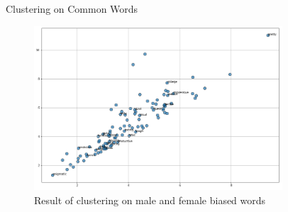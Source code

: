 \documentclass{beamer}
\begin{document}
	\begin{frame}{Clustering on Common Words}
		\vspace{3mm}
		\begin{figure}[H]
			\centerline{\includegraphics[width=25em]{biased_misc.png}}
			\caption{Result of clustering on male and female biased words}
			\label{common-cluster-fig}
		\end{figure}
	\end{frame}
\end{document}
